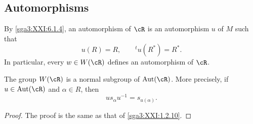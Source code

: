 \subsection{Automorphisms}\label{sga3:XXI:6.7}

By \ref{sga3:XXI:6.1.4}, an automorphism of \(\cR\) is an
automorphism \(u\) of \(M\) such that
\[
 u(R)=R,
 \qquad
 {}^tu(R^\ast)=R^\ast.
\]
In particular, every \(w\in W(\cR)\) defines an automorphism of
\(\cR\).

\begin{lemma}\label{sga3:XXI:6.7.1}
The group \(W(\cR)\) is a normal subgroup of
\(\operatorname{Aut}(\cR)\). More precisely, if
\(u\in\operatorname{Aut}(\cR)\) and \(\alpha\in R\), then
\[
 us_\alpha u^{-1}=s_{u(\alpha)}.
\]
\end{lemma}

\begin{proof}
The proof is the same as that of \ref{sga3:XXI:1.2.10}.
\end{proof}
